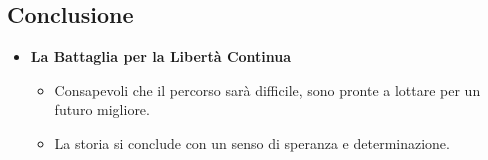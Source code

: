 \subsection*{Conclusione}

\begin{itemize}
    \item \textbf{La Battaglia per la Libertà Continua}
    \begin{itemize}
        \item Consapevoli che il percorso sarà difficile, sono pronte a lottare per un futuro migliore.
        \item La storia si conclude con un senso di speranza e determinazione.
    \end{itemize}
\end{itemize}
